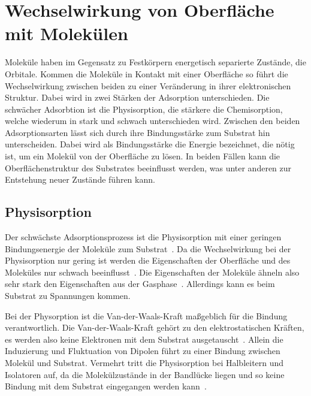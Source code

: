     \section{Wechselwirkung von Oberfläche mit Molekülen} \label{sec:WW}
        Moleküle haben im Gegensatz zu Festkörpern energetisch separierte Zustände, die Orbitale.
        Kommen die Moleküle in Kontakt mit einer Oberfläche so führt die Wechselwirkung zwischen beiden zu einer Veränderung in ihrer elektronischen Struktur.
        Dabei wird in zwei Stärken der Adsorption unterschieden.
        Die schwächer Adsorbtion ist die Physisorption, die stärkere die Chemisorption, welche wiederum in stark und schwach unterschieden wird.
        Zwischen den beiden Adsorptionsarten lässt sich durch ihre Bindungsstärke zum Substrat hin unterscheiden.
        Dabei wird als Bindungsstärke die Energie bezeichnet, die nötig ist, um ein Molekül von der Oberfläche zu lösen.
        In beiden Fällen kann die Oberflächenstruktur des Substrates beeinflusst werden, was unter anderen zur Entstehung neuer Zustände führen kann.
        
        \subsection{Physisorption}
            Der schwächste Adsorptionsprozess ist die Physisorption mit einer geringen Bindungsenergie der Moleküle zum Substrat~\cite{IF_16}. 
            Da die Wechselwirkung bei der Physisorption nur gering ist werden die Eigenschaften der Oberfläche und des Moleküles nur schwach beeinflusst~\cite{bergenti_spinterface_2019}.
            Die Eigenschaften der Moleküle ähneln also sehr stark den Eigenschaften aus der Gasphase~\cite{IF_16}.
            Allerdings kann es beim Substrat zu Spannungen kommen.

            Bei der Physorption ist die Van-der-Waals-Kraft maßgeblich für die Bindung verantwortlich.
            Die Van-der-Waals-Kraft gehört zu den elektrostatischen Kräften, es werden also keine Elektronen mit dem Substrat ausgetauscht~\cite{bergenti_spinterface_2019}.
            Allein die Induzierung und Fluktuation von Dipolen führt zu einer Bindung zwischen Molekül und Substrat.
            Vermehrt tritt die Physisorption bei Halbleitern und Isolatoren auf, da die Molekülzustände in der Bandlücke liegen und so keine Bindung mit dem Substrat eingegangen werden kann~\cite{IF_1}.


